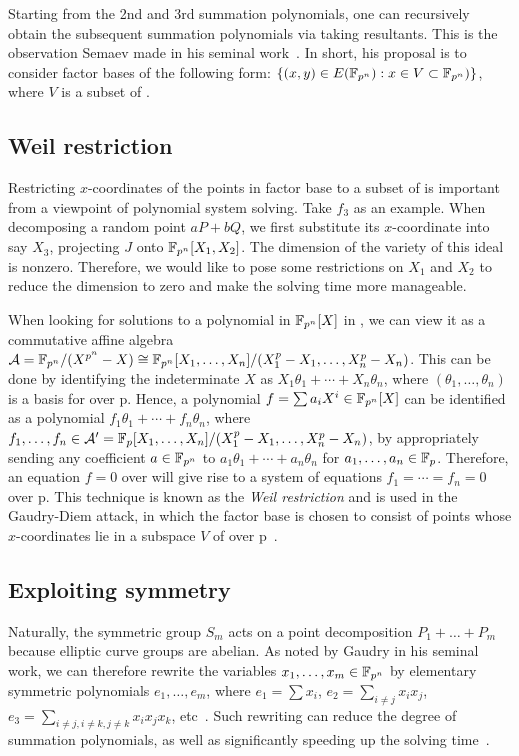 Starting from the 2nd and 3rd summation polynomials, one can
recursively obtain the subsequent summation polynomials via taking
resultants.
%
This is the observation Semaev made in his seminal
work~\cite{DBLP:journals/iacr/Semaev04}.
%
In short, his proposal is to consider factor bases of the following
form: $\{(x,y)\in E(\mathbb F_{p^n}):x\in V\subset\mathbb F_{p^n})\}$, where $V$ is a
subset of .

\subsection{Weil restriction}
%
Restricting $x$-coordinates of the points in factor base to a subset
of  is important from a viewpoint of polynomial system solving.
%
Take $f_3$ as an example.
%
When decomposing a random point $aP+bQ$, we first substitute its
$x$-coordinate into say $X_3$, projecting $J$ onto $\mathbb F_{p^n}[X_1,X_2]$.
%
The dimension of the variety of this ideal is nonzero.
%
Therefore, we would like to pose some restrictions on $X_1$ and $X_2$
to reduce the dimension to zero and make the solving time more
manageable.

When looking for solutions to a polynomial in $\mathbb F_{p^n}[X]$ in ,
we can view it as a commutative affine algebra
$\mathcal A=\mathbb F_{p^n}/(X^{p^n} - X)\cong\mathbb F_{p^n}[X_1,\ldots,X_n]/(X_1^p -
X_1,\ldots,X_n^p - X_n)$.
%
This can be done by identifying the indeterminate $X$ as
$X_1\theta_1+\cdots+X_n\theta_n$, where $(\theta_1,\ldots,\theta_n)$
is a basis for  over \F p.
%
Hence, a polynomial $f=\sum a_iX^i\in\mathbb F_{p^n}[X]$ can be identified as
a polynomial $f_1\theta_1+\cdots+f_n\theta_n$, where
$f_1,\ldots,f_n\in\mathcal A'=\mathbb F_{p}[X_1,\ldots,X_n]/(X_1^p -
X_1,\ldots,X_n^p - X_n)$, by appropriately sending any coefficient
$a\in\mathbb F_{p^n}$ to $a_1\theta_1+\cdots+a_n\theta_n$ for
$a_1,\ldots,a_n\in\mathbb F_{p}$.
%
Therefore, an equation $f=0$ over  will give rise to a system
of equations $f_1=\cdots=f_n=0$ over \F p.
%
This technique is known as the \emph{Weil restriction} and is used in
the Gaudry-Diem attack, in which the factor base is chosen to consist
of points whose $x$-coordinates lie in a subspace $V$ of  over
\F p~\cite{DBLP:journals/jsc/Gaudry09,DBLP:journals/moc/Diem11}.

\subsection{Exploiting symmetry}
%
\label{sec:exploit-symmetry}
%
Naturally, the symmetric group $S_m$ acts on a point decomposition
$P_1+\ldots+P_m$ because elliptic curve groups are abelian.
%
As noted by Gaudry in his seminal work, we can therefore rewrite the
variables $x_1,\ldots,x_m\in\mathbb F_{p^n}$ by elementary symmetric
polynomials $e_1,\ldots,e_m$, where $e_1=\sum x_i$,
$e_2=\sum_{i\neq j}x_ix_j$,
$e_3=\sum_{i\neq j,i\neq k,j\neq k}x_ix_jx_k$,
etc~\cite{DBLP:journals/jsc/Gaudry09}.
%
Such rewriting can reduce the degree of summation polynomials, as well
as significantly speeding up the solving
time~\cite{DBLP:conf/eurocrypt/FaugerePPR12,DBLP:conf/iwsec/HuangPST13}.

